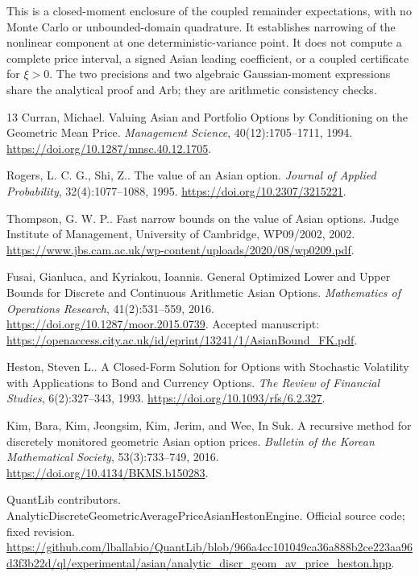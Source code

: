 \documentclass[11pt,a4paper]{article}
\begin{document}
This is a closed-moment enclosure of the coupled remainder expectations,
with no Monte Carlo or unbounded-domain quadrature. It establishes narrowing
of the nonlinear component at one deterministic-variance point. It does not
compute a complete price interval, a signed Asian leading coefficient, or a
coupled certificate for \(\xi>0\). The two precisions and two algebraic
Gaussian-moment expressions share the analytical proof and Arb; they are
arithmetic consistency checks.

\begin{thebibliography}{13}
Curran, Michael.
Valuing {Asian} and Portfolio Options by Conditioning on the Geometric Mean Price.
\emph{Management Science}, 40(12):1705--1711, 1994.
\url{https://doi.org/10.1287/mnsc.40.12.1705}.

Rogers, L. C. G., Shi, Z..
The value of an {Asian} option.
\emph{Journal of Applied Probability}, 32(4):1077--1088, 1995.
\url{https://doi.org/10.2307/3215221}.

Thompson, G. W. P..
Fast narrow bounds on the value of {Asian} options.
Judge Institute of Management, University of Cambridge, WP09/2002, 2002.
\url{https://www.jbs.cam.ac.uk/wp-content/uploads/2020/08/wp0209.pdf}.

Fusai, Gianluca, and Kyriakou, Ioannis.
General Optimized Lower and Upper Bounds for Discrete and Continuous Arithmetic {Asian} Options.
\emph{Mathematics of Operations Research}, 41(2):531--559, 2016.
\url{https://doi.org/10.1287/moor.2015.0739}.
Accepted manuscript: \url{https://openaccess.city.ac.uk/id/eprint/13241/1/AsianBound_FK.pdf}.

Heston, Steven L..
A Closed-Form Solution for Options with Stochastic Volatility with Applications to Bond and Currency Options.
\emph{The Review of Financial Studies}, 6(2):327--343, 1993.
\url{https://doi.org/10.1093/rfs/6.2.327}.

Kim, Bara, Kim, Jeongsim, Kim, Jerim, and Wee, In Suk.
A recursive method for discretely monitored geometric {Asian} option prices.
\emph{Bulletin of the Korean Mathematical Society}, 53(3):733--749, 2016.
\url{https://doi.org/10.4134/BKMS.b150283}.

{QuantLib contributors}.
{AnalyticDiscreteGeometricAveragePriceAsianHestonEngine}.
Official source code; fixed revision.
\url{https://github.com/lballabio/QuantLib/blob/966a4cc101049ca36a888b2ce223aa96d3f3b22d/ql/experimental/asian/analytic_discr_geom_av_price_heston.hpp}.


\end{thebibliography}
\end{document}
